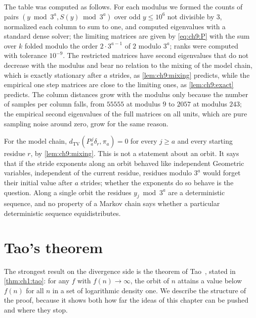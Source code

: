 The table was computed as follows. For each modulus we formed the counts of
pairs $(y\bmod3^a,S(y)\bmod3^a)$ over odd $y\le10^6$ not divisible by $3$,
normalized each column to sum to one, and computed eigenvalues with a standard
dense solver; the limiting matrices are given by \eqref{eq:ch9:P} with the sum
over $k$ folded modulo the order $2\cdot3^{a-1}$ of $2$ modulo $3^a$; ranks were
computed with tolerance $10^{-9}$. The restricted matrices have second
eigenvalues that do not decrease with the modulus and bear no relation to the
mixing of the model chain, which is exactly stationary after $a$ strides, as
\cref{lem:ch9:mixing} predicts, while the empirical one step matrices are close
to the limiting ones, as \cref{lem:ch9:exact} predicts. The column distances
grow with the modulus only because the number of samples per column falls,
from $55555$ at modulus $9$ to $2057$ at modulus $243$; the empirical second
eigenvalues of the full matrices on all units, which are pure sampling noise around zero,
grow for the same reason.

\begin{remark}\label{rem:ch9:tv}
For the model chain, $d_{\mathrm{TV}}(P_a^{\,j}\delta_r,\pi_a)=0$ for every
$j\geq a$ and every starting residue $r$, by \cref{lem:ch9:mixing}. This is not a statement about an orbit. It says
that if the stride exponents along an orbit behaved like independent
Geometric variables, independent of the current residue, residues modulo $3^a$ would forget their initial value
after $a$ strides; whether the exponents do so behave is the question. Along a single orbit the residues $y_j\bmod3^a$ are a deterministic sequence, and no property of a Markov chain says whether a particular deterministic sequence equidistributes.
\end{remark}

\section{Tao's theorem}\label{sec:ch9:tao}

The strongest result on the divergence side is the theorem of
Tao~\cite[Theorem~1.3]{tao2022}, stated in \cref{thm:ch1:tao}: for any $f$ with
$f(n)\to\infty$, the orbit of $n$ attains a value below $f(n)$ for all $n$ in a
set of logarithmic density one. We describe the structure of the proof,
because it shows both how far the ideas of this chapter can be pushed and
where they stop.


